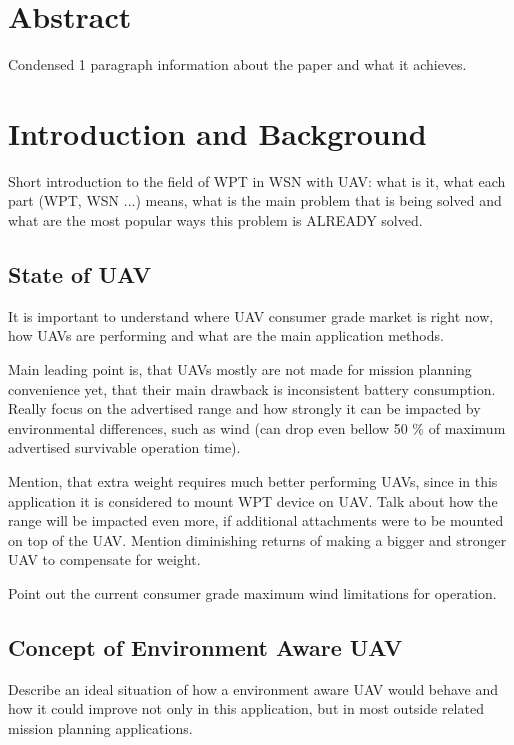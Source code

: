 \documentclass[11pt,a4paper,footinclude=true,headinclude=true, oneside]{scrbook}
\begin{document}
\chapter{Abstract}

Condensed 1 paragraph information about the paper and what it achieves.

\tableofcontents

\chapter{Introduction and Background}

Short introduction to the field of WPT in WSN with UAV: what is it, what each part (WPT, WSN ...) means, what is the main problem that is being solved and what are the most popular ways this problem is ALREADY solved.

\section{State of UAV}

It is important to understand where UAV consumer grade market is right now, how UAVs are performing and what are the main application methods.

Main leading point is, that UAVs mostly are not made for mission planning convenience yet, that their main drawback is inconsistent battery consumption. Really focus on the advertised range and how strongly it can be impacted by environmental differences, such as wind (can drop even bellow 50 \% of maximum advertised survivable operation time).

Mention, that extra weight requires much better performing UAVs, since in this application it is considered to mount WPT device on UAV. Talk about how the range will be impacted even more, if additional attachments were to be mounted on top of the UAV. Mention diminishing returns of making a bigger and stronger UAV to compensate for weight.

Point out the current consumer grade maximum wind limitations for operation.

\section{Concept of Environment Aware UAV}

Describe an ideal situation of how a environment aware UAV would behave and how it could improve not only in this application, but in most outside related mission planning applications.
\end{document}
